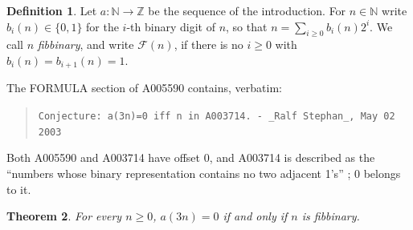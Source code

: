 \documentclass[11pt]{amsart}
\theoremstyle{plain}
\newtheorem{theorem}{Theorem}
\theoremstyle{definition}
\newtheorem{definition}[theorem]{Definition}
\newcommand{\N}{\mathbb{N}}
\newcommand{\Z}{\mathbb{Z}}
\newcommand{\Fib}{\mathcal{F}}
\begin{document}
\begin{definition}\label{def:main}
Let $a\colon\N\to\Z$ be the sequence of the introduction. For $n\in\N$ write $b_i(n)\in\{0,1\}$ for the $i$-th binary digit of $n$, so that $n=\sum_{i\ge0}b_i(n)2^i$. We call $n$ \emph{fibbinary}, and write $\Fib(n)$, if there is no $i\ge0$ with $b_i(n)=b_{i+1}(n)=1$.
\end{definition}

The FORMULA section of A005590 \cite{A005590} contains, verbatim:
\begin{quote}
{\small\texttt{Conjecture: a(3n)=0 iff n in A003714. - \_Ralf Stephan\_, May 02 2003}}
\end{quote}
Both A005590 and A003714 have offset $0$, and A003714 is described as the ``numbers whose binary representation contains no two adjacent 1's'' \cite{A003714}; $0$ belongs to it.

\begin{theorem}\label{thm:main}
For every $n\ge0$, $a(3n)=0$ if and only if $n$ is fibbinary.
\end{theorem}
\end{document}
